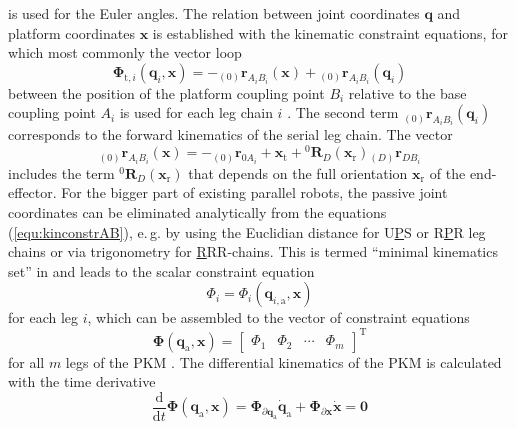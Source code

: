 \documentclass[robotics,article,submit,moreauthors,pdftex]{Definitions/mdpi}
\newcommand{\bm}[1]{\boldsymbol{#1}}
\newcommand{\ortvek}[4]{{ }_{(#1)}{\boldsymbol{#2}}^{#3}_{#4} }
\newcommand{\rotmat}[2]{{{ }^{#1}\boldsymbol{R}}_{#2}}
\newcommand{\transp}[0]{{\mathrm{T}}}
\begin{document}
%
is used for the Euler angles.
%
The relation between joint coordinates $\bm{q}$ and platform coordinates $\bm{x}$ is established with the kinematic constraint equations, for which most commonly the vector loop
%
\begin{equation}
\bm{\Phi}_{\mathrm{t},i}(\bm{q}_i,\bm{x}) = - \ortvek{0}{r}{}{A_iB_i}(\bm{x}) + \ortvek{0}{r}{}{A_iB_i}(\bm{q}_i) 
\label{equ:kinconstrAB}
\end{equation}
%
between the position of the platform coupling point $B_i$ relative to the base coupling point $A_i$ is used for each leg chain $i$ \cite{Merlet2006}.
The second term $\ortvek{0}{r}{}{A_iB_i}(\bm{q}_i)$ corresponds to the forward kinematics of the serial leg chain. 
The vector
\begin{equation}
\ortvek{0}{r}{}{A_iB_i}(\bm{x}) = 
- \ortvek{0}{r}{}{0A_i}
+ \bm{x}_{\mathrm{t}} + \rotmat{0}{D}(\bm{x}_{\mathrm{r}}) \ortvek{D}{r}{}{DB_i}
\label{equ:vec_AB}
\end{equation}
%
includes the term $\rotmat{0}{D}(\bm{x}_{\mathrm{r}})$ that depends on the full  orientation $\bm{x}_{\mathrm{r}}$ of the end-effector.
%
For the bigger part of existing parallel robots, the passive joint coordinates can be eliminated analytically from the equations (\ref{equ:kinconstrAB}), e.\,g. by using the Euclidian distance for U\underline{P}S or R\underline{P}R leg chains or via trigonometry for \underline{R}RR-chains.
This is termed ``minimal kinematics set'' in \cite{Merlet2006} and leads to the scalar constraint equation
%
\begin{equation}
\Phi_{i}
=
\Phi_{i}(\bm{q}_{i,\mathrm{a}},\bm{x})
\end{equation}
%
for each leg $i$, which can be assembled to the vector of constraint equations
%
\begin{equation}
\bm{\Phi}(\bm{q}_{\mathrm{a}},\bm{x})
=
\begin{bmatrix}
\Phi_1 & \Phi_2 & \cdots & \Phi_m
\end{bmatrix}^\transp
\label{equ:constr_qa}
\end{equation}
%
for all $m$ legs of the PKM .
The differential kinematics of the PKM is calculated with the time derivative
%
\begin{equation}
\frac{\mathrm{d}}{{\mathrm{d}}t} \bm{\Phi}(\bm{q}_\mathrm{a},\bm{x})
=
\bm{\Phi}_{\partial \bm{q}_\mathrm{a}}  \dot{\bm{q}}_\mathrm{a}
+
\bm{\Phi}_{\partial \bm{x}} \dot{\bm{x}}
=
\bm{0}
\label{equ:constr_qa_diff}
\end{equation}
\end{document}

